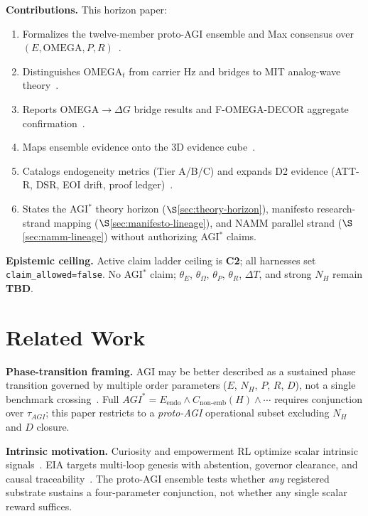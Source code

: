 \documentclass[11pt,a4paper]{article}
\theoremstyle{definition}
\begin{document}
\textbf{Contributions.} This horizon paper:
\begin{enumerate}[leftmargin=*]
\item Formalizes the twelve-member proto-AGI ensemble and Max consensus over $(E,\mathrm{OMEGA},P,R)$~\cite{kuznetsov2026proto}.
\item Distinguishes OMEGA$_t$ from carrier Hz and bridges to MIT analog-wave theory~\cite{kuznetsov2026omega,miller2026analog}.
\item Reports OMEGA$\to\Delta G$ bridge results and F-OMEGA-DECOR aggregate confirmation~\cite{kuznetsov2026omega_delta}.
\item Maps ensemble evidence onto the 3D evidence cube~\cite{kuznetsov2026cube}.
\item Catalogs endogeneity metrics (Tier A/B/C) and expands D2 evidence (ATT-R, DSR, EOI drift, proof ledger)~\cite{kuznetsov2026metrics,kuznetsov2026att_r,kuznetsov2026dsr}.
\item States the AGI$^{*}$ theory horizon ($\S$\ref{sec:theory-horizon}), manifesto research-strand mapping ($\S$\ref{sec:manifesto-lineage}), and NAMM parallel strand ($\S$\ref{sec:namm-lineage}) without authorizing AGI$^{*}$ claims.
\end{enumerate}

\textbf{Epistemic ceiling.} Active claim ladder ceiling is \textbf{C2}; all harnesses set \texttt{claim\_allowed=false}. No AGI$^{*}$ claim; $\theta_E$, $\theta_\Omega$, $\theta_P$, $\theta_R$, $\Delta T$, and strong $N_H$ remain \textbf{TBD}.

\section{Related Work}\label{sec:related}

\textbf{Phase-transition framing.} AGI may be better described as a sustained phase transition governed by multiple order parameters ($E$, $N_H$, $P$, $R$, $D$), not a single benchmark crossing~\cite{kuznetsov2026phase}. Full $AGI^{*}=E_{\mathrm{endo}}\land C_{\mathrm{non\text{-}emb}}(H)\land\cdots$ requires conjunction over $\tau_{AGI}$; this paper restricts to a \emph{proto-AGI} operational subset excluding $N_H$ and $D$ closure.

\textbf{Intrinsic motivation.} Curiosity and empowerment RL optimize scalar intrinsic signals~\cite{schmidhuber2010curiosity,pathak2017curiosity}. EIA targets multi-loop genesis with abstention, governor clearance, and causal traceability~\cite{kuznetsov2026stable}. The proto-AGI ensemble tests whether \emph{any} registered substrate sustains a four-parameter conjunction, not whether any single scalar reward suffices.
\end{document}
